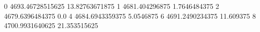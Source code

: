 0 4693.46728515625 13.82763671875
1 4681.404296875 1.7646484375
2 4679.6396484375 0.0
4 4684.6943359375 5.0546875
6 4691.2490234375 11.609375
8 4700.9931640625 21.353515625
